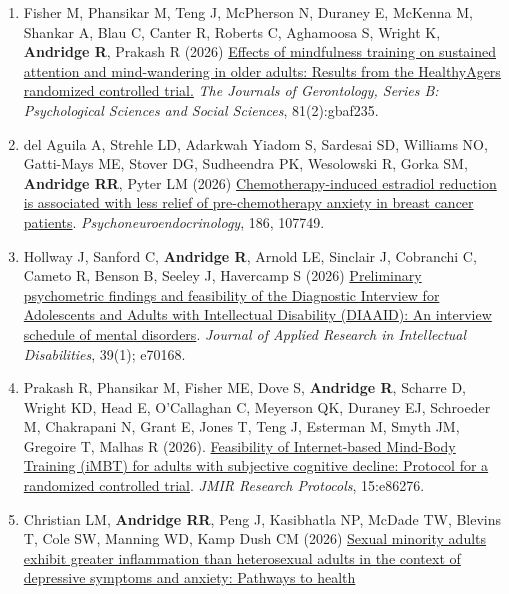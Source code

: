 \documentclass[
  english,
  letterpaper,
  DIV=11,
  numbers=noendperiod]{scrartcl}
\begin{document}
\begin{enumerate}
  \href{https://doi.org/10.1080/19447515.2026.2669462}{Confirming the
  tripartite factor structure of the Diagnostic Adaptive Behavior
  Scale.} \emph{American Journal on Intellectual and Developmental
  Disabilities}, 1--10.
\item
  Fisher M, Phansikar M, Teng J, McPherson N, Duraney E, McKenna M,
  Shankar A, Blau C, Canter R, Roberts C, Aghamoosa S, Wright K,
  \textbf{Andridge R}, Prakash R (2026)
  \href{https://doi.org/10.1093/geronb/gbaf235}{Effects of mindfulness
  training on sustained attention and mind-wandering in older adults:
  Results from the HealthyAgers randomized controlled trial.} \emph{The
  Journals of Gerontology, Series B: Psychological Sciences and Social
  Sciences}, 81(2):gbaf235.
\item
  del Aguila A, Strehle LD, Adarkwah Yiadom S, Sardesai SD, Williams NO,
  Gatti-Mays ME, Stover DG, Sudheendra PK, Wesolowski R, Gorka SM,
  \textbf{Andridge RR}, Pyter LM (2026)
  \href{https://doi.org/10.1016/j.psyneuen.2026.107749}{Chemotherapy-induced
  estradiol reduction is associated with less relief of pre-chemotherapy
  anxiety in breast cancer patients}. \emph{Psychoneuroendocrinology},
  186, 107749.
\item
  Hollway J, Sanford C, \textbf{Andridge R}, Arnold LE, Sinclair J,
  Cobranchi C, Cameto R, Benson B, Seeley J, Havercamp S (2026)
  \href{http://dx.doi.org/10.1111/jar.70168}{Preliminary psychometric
  findings and feasibility of the Diagnostic Interview for Adolescents
  and Adults with Intellectual Disability (DIAAID): An interview
  schedule of mental disorders}. \emph{Journal of Applied Research in
  Intellectual Disabilities}, 39(1); e70168.
\item
  Prakash R, Phansikar M, Fisher ME, Dove S, \textbf{Andridge R},
  Scharre D, Wright KD, Head E, O'Callaghan C, Meyerson QK, Duraney EJ,
  Schroeder M, Chakrapani N, Grant E, Jones T, Teng J, Esterman M, Smyth
  JM, Gregoire T, Malhas R (2026).
  \href{https://doi.org/10.2196/86276}{Feasibility of Internet-based
  Mind-Body Training (iMBT) for adults with subjective cognitive
  decline: Protocol for a randomized controlled trial}. \emph{JMIR
  Research Protocols}, 15:e86276.
\item
  Christian LM, \textbf{Andridge RR}, Peng J, Kasibhatla NP, McDade TW,
  Blevins T, Cole SW, Manning WD, Kamp Dush CM (2026)
  \href{https://doi.org/10.1016/j.bbi.2025.106202}{Sexual minority
  adults exhibit greater inflammation than heterosexual adults in the
  context of depressive symptoms and anxiety: Pathways to health
}
\end{enumerate}
\end{document}
